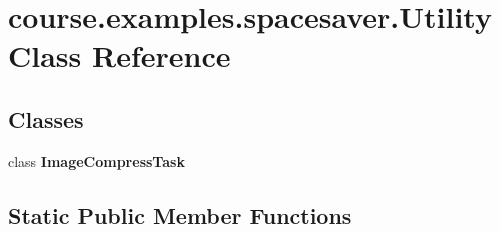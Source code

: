 \hypertarget{classcourse_1_1examples_1_1spacesaver_1_1_utility}{}\section{course.\+examples.\+spacesaver.\+Utility Class Reference}
\label{classcourse_1_1examples_1_1spacesaver_1_1_utility}
\subsection*{Classes}
\begin{DoxyCompactItemize}
\item 
class {\bfseries Image\+Compress\+Task}
\end{DoxyCompactItemize}
\subsection*{Static Public Member Functions}
